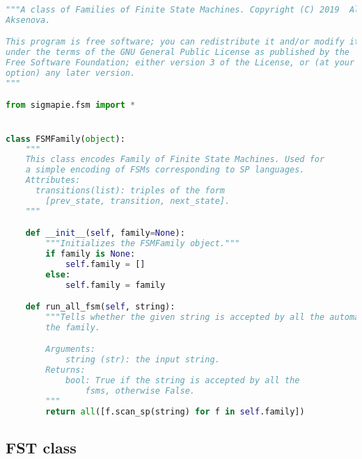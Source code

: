 \begin{lstlisting}[language=Python]
"""A class of Families of Finite State Machines. Copyright (C) 2019  Alena
Aksenova.

This program is free software; you can redistribute it and/or modify it
under the terms of the GNU General Public License as published by the
Free Software Foundation; either version 3 of the License, or (at your
option) any later version.
"""

from sigmapie.fsm import *


class FSMFamily(object):
    """
    This class encodes Family of Finite State Machines. Used for 
    a simple encoding of FSMs corresponding to SP languages.
    Attributes:
      transitions(list): triples of the form 
        [prev_state, transition, next_state].
    """

    def __init__(self, family=None):
        """Initializes the FSMFamily object."""
        if family is None:
            self.family = []
        else:
            self.family = family

    def run_all_fsm(self, string):
        """Tells whether the given string is accepted by all the automata of
        the family.

        Arguments:
            string (str): the input string.
        Returns:
            bool: True if the string is accepted by all the
                fsms, otherwise False.
        """
        return all([f.scan_sp(string) for f in self.family])
\end{lstlisting}

\subsection*{FST class}

